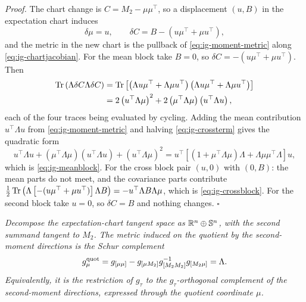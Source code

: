 \noindent\emph{Proof.} The chart change is $C=M_2-\mu\mu^\top$, so a displacement $(u,B)$ in the expectation chart induces
\begin{equation}
\delta\mu=u,
\qquad
\delta C=B-\left(u\mu^\top+\mu u^\top\right),
\label{eq:ig-chartjacobian}
\end{equation}
and the metric in the new chart is the pullback of \eqref{eq:ig-moment-metric} along \eqref{eq:ig-chartjacobian}. For the mean block take $B=0$, so $\delta C=-(u\mu^\top+\mu u^\top)$. Then
\begin{align}
\operatorname{Tr}\left(\Lambda \delta C \Lambda \delta C\right)
&=\operatorname{Tr}\left[\left(\Lambda u\mu^\top+\Lambda\mu u^\top\right)\left(\Lambda u\mu^\top+\Lambda\mu u^\top\right)\right]
\notag\\
&=2\left(u^\top\Lambda\mu\right)^2+2\left(\mu^\top\Lambda\mu\right)\left(u^\top\Lambda u\right),
\label{eq:ig-crossterm}
\end{align}
each of the four traces being evaluated by cycling. Adding the mean contribution $u^\top\Lambda u$ from \eqref{eq:ig-moment-metric} and halving \eqref{eq:ig-crossterm} gives the quadratic form
\begin{equation}
u^\top\Lambda u+\left(\mu^\top\Lambda\mu\right)\left(u^\top\Lambda u\right)+\left(u^\top\Lambda\mu\right)^2
=u^\top\left[\left(1+\mu^\top\Lambda\mu\right)\Lambda+\Lambda\mu\mu^\top\Lambda\right]u,
\label{eq:ig-meanquad}
\end{equation}
which is \eqref{eq:ig-meanblock}. For the cross block pair $(u,0)$ with $(0,B)$: the mean parts do not meet, and the covariance parts contribute $\tfrac12\operatorname{Tr}\left(\Lambda\left[-(u\mu^\top+\mu u^\top)\right]\Lambda B\right)=-u^\top\Lambda B\Lambda\mu$, which is \eqref{eq:ig-crossblock}. For the second block take $u=0$, so $\delta C=B$ and nothing changes. \hfill$\square$

\medskip
{}
\emph{Decompose the expectation-chart tangent space as
$\mathbb R^n\oplus\mathbb S^n$, with the second summand tangent to $M_2$. The metric
induced on the quotient by the second-moment directions is the Schur
complement}
\begin{equation}
g_{\mu}^{\rm quot}
=g_{[\mu\mu]}
-g_{[\mu M_2]}g_{[M_2M_2]}^{-1}g_{[M_2\mu]}
=\Lambda.
\label{eq:ig-expectation-mean-quotient}
\end{equation}
\emph{Equivalently, it is the restriction of $g_\tau$ to the
$g_\tau$-orthogonal complement of the second-moment directions, expressed
through the quotient coordinate $\mu$.} 

